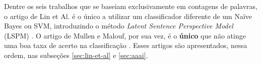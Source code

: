 


Dentre os seis trabalhos que se baseiam exclusivamente em contagens de palavras, o artigo de Lin et Al. é o único a utilizar um classificador diferente de um Naïve Bayes ou SVM, introduzindo o método \emph{Latent Sentence Perspective Model} (LSPM) \cite{lin-et-al2006}. O artigo de Mullen e Malouf, por sua vez, é o \textbf{único} que não atinge uma boa taxa de acerto na classificação \cite{aaai-politics}. Esses artigos são apresentados, nessa ordem, nas subseções \ref{sec:lin-et-al} e \ref{sec:aaai}. %

